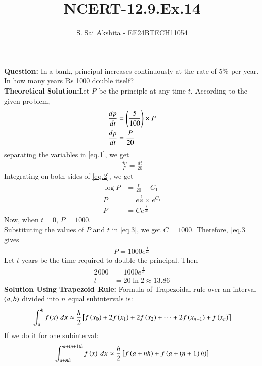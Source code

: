 \documentclass[journal,12pt,onecolumn]{IEEEtran}
\theoremstyle{remark}
\begin{document}

\vspace{3cm}

\title{NCERT-12.9.Ex.14}
\author{S. Sai Akshita - EE24BTECH11054}
\newpage
\maketitle
\bigskip

\renewcommand{\thefigure}{\theenumi}
\renewcommand{\thetable}{\theenumi}
\textbf{Question:} In a bank, principal increases continuously at the rate of $5\%$ per year. In how many years Rs 1000 double itself?\\
\textbf{Theoretical Solution:}Let $P$ be the principle at any time $t$. According to the given problem,
\begin{align}
    \frac{dp}{dt}&=\left(\frac{5}{100}\right)\times P\\
\frac{dp}{dt}&=\frac{P}{20} \label{eq.1}
\end{align}
separating the variables in \ref{eq.1}, we get
\begin{align}
    \frac{dp}{P}=\frac{dt}{20}\label{eq.2}
\end{align}
Integrating on both sides of \ref{eq.2}, we get
\begin{align}
    \log P&=\frac{t}{20} + C_1\\
    P&=e^{\frac{t}{20}}\times e^{C_1}\\
    P&= Ce^{\frac{t}{20}} \label{eq.3}
\end{align}
Now, when $t=0$, $P=1000$.\\ Substituting the values of $P$ and $t$ in \ref{eq.3}, we get $C=1000$. Therefore, \ref{eq.3} gives
\begin{align}
    P=1000e^{\frac{t}{20}}
\end{align}
Let $t$ years be the time required to double the principal. Then
\begin{align}
    2000&=1000e^{\frac{t}{20}}\\
    t&=20\ln 2 \approx 13.86
\end{align}
\textbf{Solution Using Trapezoid Rule:}
Formula of Trapezoidal rule over an interval $\left(a,b\right)$ divided into $n$ equal subintervals is:
\begin{align}
    \int_a^b f\left(x\right) \, dx \approx \frac{h}{2} {}\left[ f\left(x_0\right) + 2f\left(x_1\right) + 2f\left(x_2\right) + \dots + 2f\left(x_{n-1}\right) + f\left(x_n\right) \right]
\end{align}
If we do it for one subinterval:
\begin{align}
    \int_{a+nh}^{a+\left(n+1\right)h} f\left(x\right) \, dx \approx \frac{h}{2}  {}\left[ f\left(a+nh\right) + f\left(a+\left(n+1\right)h\right) \right]\label{eq.4}
\end{align}
\end{document}

